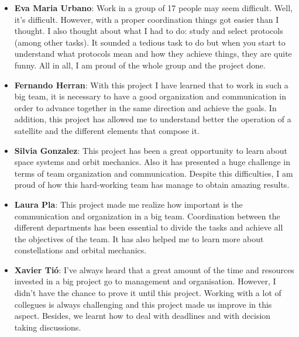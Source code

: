 {\begin{itemize}
 
\item \textbf{Eva Maria Urbano}: Work in a group of 17 people may seem difficult. Well, it's difficult. However, with a proper coordination things got easier than I thought. I also thought about what I had to do: study and select protocols (among other tasks). It sounded a tedious task to do but when you start to understand what protocols mean and how they achieve things, they are quite funny. All in all, I am proud of the whole group and the project done.

 
\item \textbf{Fernando Herran}: With this project I have learned that to work in such a big team, it is necessary to have a good organization and communication in order to advance together in the same direction and  achieve the goals. In addition, this project has allowed me to understand better the operation of a satellite and the different elements that compose it.

\item \textbf{Silvia Gonzalez}: This project has been a great opportunity to learn about space systems and orbit mechanics. Also it has presented a huge challenge in terms of team organization and communication. Despite this difficulties, I am proud of how this hard-working team has manage to obtain amazing results.

\item \textbf{Laura Pla}: This project made me realize how important is the communication and organization in a big team.  Coordination between the different departments has been essential to divide the tasks and achieve all the objectives of the team. It has also helped me to learn more about constellations and orbital mechanics.

\item \textbf{Xavier Tió}: I've always heard that a great amount of the time and resources invested in a big project go to management and organisation. However, I didn't have the chance to prove it until this project. Working with a lot of collegues is always challenging and this project made us improve  in this aspect. Besides, we learnt how to deal with deadlines and with decision taking discussions. 
 

\end{itemize}
}